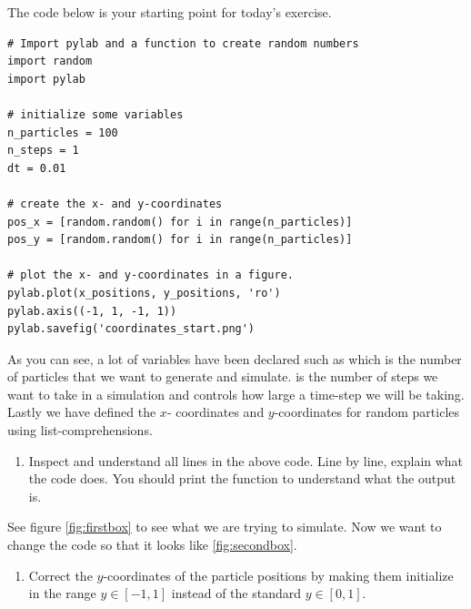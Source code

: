 \documentclass{article}
\begin{document}
The code below is your starting point for today's exercise.

\begin{lstlisting}
# Import pylab and a function to create random numbers
import random
import pylab

# initialize some variables
n_particles = 100
n_steps = 1
dt = 0.01

# create the x- and y-coordinates
pos_x = [random.random() for i in range(n_particles)]
pos_y = [random.random() for i in range(n_particles)]

# plot the x- and y-coordinates in a figure.
pylab.plot(x_positions, y_positions, 'ro')
pylab.axis((-1, 1, -1, 1))
pylab.savefig('coordinates_start.png')

\end{lstlisting}

As you can see, a lot of variables have been declared such as
 which
is the number of particles that we want to generate and simulate.
 is
the number of steps we want to take in a simulation
and  controls how large a time-step we will be taking.
Lastly we have defined the
$x$- coordinates and
$y$-coordinates for
 random particles using list-comprehensions.

\begin{enumerate}
  \item Inspect and understand all lines in the above code.
    Line by line, explain what the code does.
    You should print the  function
    to understand what the output is.
\end{enumerate}

See figure \ref{fig:firstbox} to see what we are trying to simulate.
Now we want to change the code so that it looks like \ref{fig:secondbox}.

\begin{enumerate}
  \item Correct the $y$-coordinates of the particle positions by making them
    initialize in the range $y \in [-1,1]$ instead of the standard $y \in [0,1]$.
\end{enumerate}
\end{document}
